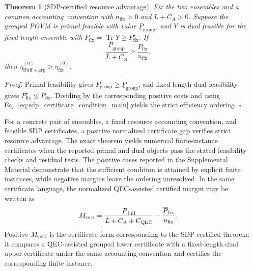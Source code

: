 \documentclass[
 reprint,
 amsmath,amssymb,
 aps,
 pra,
 floatfix,
]{revtex4-2}
\newtheorem{theorem}{Theorem}
\begin{document}
\begin{theorem}[SDP-certified resource advantage]\label{thm:sdp-resource}
Fix the two ensembles and a common accounting convention with $n_{\mathrm{fix}}>0$ and $\bar L+C_A>0$. Suppose the grouped POVM is primal feasible with value $\underline P_{\mathrm{group}}$, and $Y$ is dual feasible for the fixed-length ensemble with $\overline P_{\mathrm{fix}}=\operatorname{Tr}Y\ge P^\star_{\mathrm{fix}}$. If
\begin{equation}
    \frac{\underline P_{\mathrm{group}}}{\bar L+C_A}>
    \frac{\overline P_{\mathrm{fix}}}{n_{\mathrm{fix}}},
    \label{eq:sdp_certificate_condition_main}
\end{equation}
then $\eta_{\mathrm{Huff+grp}}^{(0)}>\eta_{\mathrm{fix}}^{(0)}$.
\end{theorem}
\textit{Proof.} Primal feasibility gives $P_{\mathrm{group}}\ge\underline P_{\mathrm{group}}$, and fixed-length dual feasibility gives $P^\star_{\mathrm{fix}}\le\overline P_{\mathrm{fix}}$. Dividing by the corresponding positive costs and using Eq.~\eqref{eq:sdp_certificate_condition_main} yields the strict efficiency ordering. \(\square\)

For a concrete pair of ensembles, a fixed resource accounting convention, and feasible SDP certificates, a positive normalized certificate gap verifies strict resource advantage. The exact theorem yields numerical finite-instance certificates when the reported primal and dual objects pass the stated feasibility checks and residual tests. The positive cases reported in the Supplemental Material demonstrate that the sufficient condition is attained by explicit finite instances, while negative margins leave the ordering unresolved.
In the same certificate language, the normalized QEC-assisted certified margin may be written as
\begin{equation}
    M_{\rm cert}
    =
    \frac{\underline P_{\mathrm{full}}}{\bar L+C_A+C_{\mathrm{QEC}}}
    -
    \frac{\overline P_{\mathrm{fix}}}{n_{\mathrm{fix}}}.
    \label{eq:certified_margin_main}
\end{equation}
Positive \(M_{\rm cert}\) is the certificate form corresponding to the SDP-certified theorem: it compares a QEC-assisted grouped lower certificate with a fixed-length dual upper certificate under the same accounting convention and certifies the corresponding finite instance.
\end{document}
